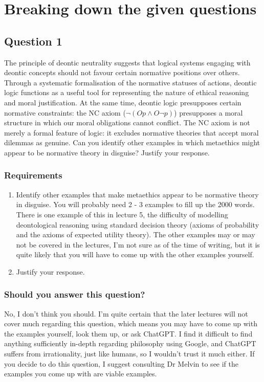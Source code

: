 \documentclass[11pt]{article}
\begin{document}
 \newpage
\section{Breaking down the given questions}
\label{sec:org15a4fc3}

\subsection{Question 1}
\label{sec:orgb5e5131}
The principle of deontic neutrality suggests that logical systems engaging with deontic concepts should not favour certain normative positions over others. Through a systematic formalisation of the normative statuses of actions, deontic logic functions as a useful tool for representing the nature of ethical reasoning and moral justification. At the same time, deontic logic presupposes certain normative constraints: the NC axiom (\(\neg(Op \wedge O \neg p)\)) presupposes a moral structure in which our moral obligations cannot conflict. The NC axiom is not merely a formal feature of logic: it excludes normative theories that accept moral dilemmas as genuine. Can you identify other examples in which metaethics might appear to be normative theory in disguise? Justify your response.
\subsubsection{Requirements}
\label{sec:orgadb25ec}
\begin{enumerate}
\item Identify other examples that make metaethics appear to be normative theory in disguise. You will probably need 2 - 3 examples to fill up the 2000 words. There is one example of this in lecture 5, the difficulty of modelling deontological reasoning using standard decision theory (axioms of probability and the axioms of expected utility theory). The other examples may or may not be covered in the lectures, I'm not sure as of the time of writing, but it is quite likely that you will have to come up with the other examples yourself.
\item Justify your response.
\end{enumerate}
\subsubsection{Should you answer this question?}
\label{sec:orgd48a797}
No, I don't think you should. I'm quite certain that the later lectures will not cover much regarding this question, which means you may have to come up with the examples yourself, look them up, or ask ChatGPT. I find it difficult to find anything sufficiently in-depth regarding philosophy using Google, and ChatGPT suffers from irrationality, just like humans, so I wouldn't trust it much either. If you decide to do this question, I suggest consulting Dr Melvin to see if the examples you come up with are viable examples.
\end{document}
